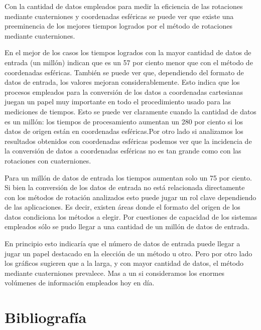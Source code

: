 \documentclass[spanish]{article}
\begin{document}
  
  Con la cantidad de datos empleados para medir la eficiencia de las rotaciones mediante cuaterniones y coordenadas esféricas se puede ver que existe una preeminencia de los mejores tiempos logrados por el método de rotaciones mediante cuaterniones. 
  
  En el mejor de los casos los tiempos logrados con la mayor cantidad de datos de entrada (un millón) indican que es un 57 por ciento menor que con el método de coordenadas esféricas. También se puede ver que, dependiendo del formato de datos de entrada, los valores mejoran considerablemente. Esto indica que los procesos empleados para la conversión de los datos a coordenadas cartesianas juegan un papel muy importante en todo el procedimiento usado para las mediciones de tiempos. Esto se puede ver claramente cuando la cantidad de datos es un millón: los tiempos de procesamiento aumentan un 280 por ciento si los datos de origen están en coordenadas esféricas.Por otro lado si analizamos los resultados obtenidos con coordenadas esféricas podemos ver que la incidencia de la conversión de datos a coordenadas esféricas no es tan grande como con las rotaciones con cuaterniones. 
  
  Para un millón de datos de entrada los tiempos aumentan solo un 75 por ciento.
  Si bien la conversión de los datos de entrada no está relacionada directamente con los métodos de rotación analizados esto puede jugar un rol clave dependiendo de las aplicaciones. Es decir, existen áreas donde el formato del origen de los datos condiciona los métodos a elegir. Por cuestiones de capacidad de los sistemas empleados sólo se pudo llegar a una cantidad de un millón de datos de entrada. 
  
  En principio esto indicaría que el número de datos de entrada puede llegar a jugar un papel destacado en la elección de un método u otro. 
  Pero por otro lado los gráficos sugieren que a la larga, y con mayor cantidad de datos, el método mediante cuaterniones prevalece. Mas a un si consideramos los enormes volúmenes de información empleados hoy en día.
  


\clearpage
  \section{Bibliograf\'ia}
\end{document}
